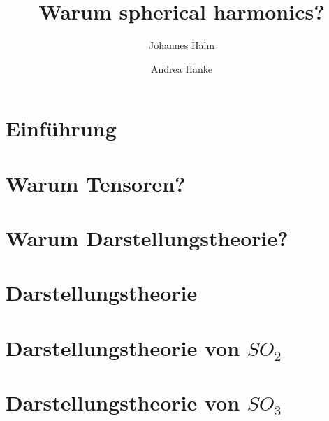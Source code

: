 \documentclass[fontsize=11pt,fleqn,a4paper]{scrartcl}
\author{Johannes Hahn \and Andrea Hanke}
\title{Warum spherical harmonics?}
\begin{document}
\maketitle

\tableofcontents

\setcounter{section}{-1}
\section{Einführung}

\section{Warum Tensoren?}



\section{Warum Darstellungstheorie?}








\section{Darstellungstheorie}
\section{Darstellungstheorie \texorpdfstring{von $SO_2$}{der zweidimensionalen Drehgruppe}}
\section{Darstellungstheorie \texorpdfstring{von $SO_3$}{der dreidimensionalen Drehgruppe}}
\end{document}
